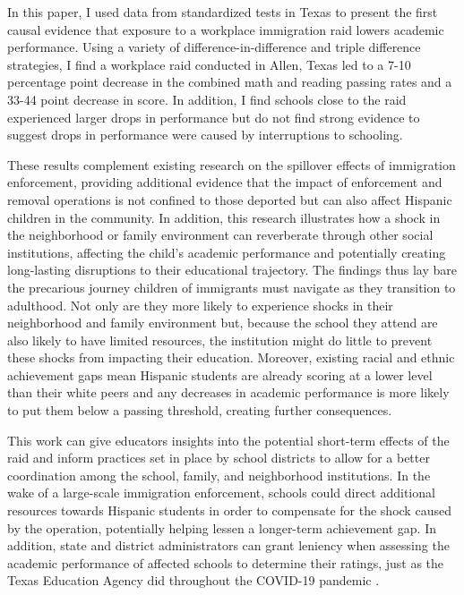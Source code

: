 \documentclass[hidelinks,twoside]{article}
\begin{document}
In this paper, I used data from standardized tests in Texas to present the first causal evidence that exposure to a workplace immigration raid lowers academic performance. Using a variety of difference-in-difference and triple difference strategies, I find a workplace raid conducted in Allen, Texas led to a 7-10 percentage point decrease in the combined math and reading passing rates and a 33-44 point decrease in score. In addition, I find schools close to the raid experienced larger drops in performance but do not find strong evidence to suggest drops in performance were caused by interruptions to schooling. 

These results complement existing research on the spillover effects of immigration enforcement, providing additional evidence that the impact of enforcement and removal operations is not confined to those deported but can also affect Hispanic children in the community. In addition, this research illustrates how a shock in the neighborhood or family environment can reverberate through other social institutions, affecting the child's academic performance and potentially creating long-lasting disruptions to their educational trajectory. The findings thus lay bare the precarious journey children of immigrants must navigate as they transition to adulthood. Not only are they more likely to experience shocks in their neighborhood and family environment but, because the school they attend are also likely to have limited resources, the institution might do little to prevent these shocks from impacting their education. Moreover, existing racial and ethnic achievement gaps mean Hispanic students are already scoring at a lower level than their white peers and any decreases in academic performance is more likely to put them below a passing threshold, creating further consequences. 

This work can give educators insights into the potential short-term effects of the raid and inform practices set in place by school districts to allow for a better coordination among the school, family, and neighborhood institutions. In the wake of a large-scale immigration enforcement, schools could direct additional resources towards Hispanic students in order to compensate for the shock caused by the operation, potentially helping lessen a longer-term achievement gap. In addition, state and district administrators can grant leniency when assessing the academic performance of affected schools to determine their ratings, just as the Texas Education Agency did throughout the COVID-19 pandemic \citep{tea_2020_sb1365}.
\end{document}
